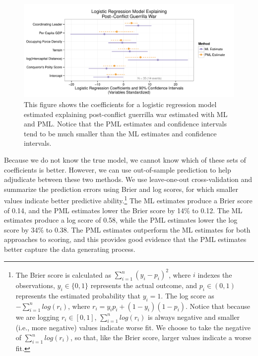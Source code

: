 \documentclass[12pt]{article}
\begin{document}
\begin{figure}[h]
\begin{center}
\includegraphics[width = \textwidth]{figs/weisiger-coefs.pdf}
\caption{This figure shows the coefficients for a logistic regression model estimated explaining post-conflict guerrilla war estimated with ML and PML.
Notice that the PML estimates and confidence intervals tend to be much smaller than the ML estimates and confidence intervals.}\label{fig:weisiger-coefs}
\end{center}
\end{figure}

Because we do not know the true model, we cannot know which of these sets of coefficients is better.
However, we can use out-of-sample prediction to help adjudicate between these two methods.
We use leave-one-out cross-validation and summarize the prediction errors using Brier and log scores, for which smaller values indicate better predictive ability.\footnote{The Brier score is calculated as $\sum_{i = 1}^n (y_i - p_i)^2$, where $i$ indexes the observations, $y_i \in \{0, 1\}$ represents the actual outcome, and $p_i \in (0, 1)$ represents the estimated probability that $y_i = 1$.
The log score as $-\sum_{i = 1}^n log(r_i)$, where $r_i = y_i p_i + (1 - y_i)(1 - p_i)$.
Notice that because we are logging $r_i \in [0, 1]$, $\sum_{i = 1}^n log(r_i)$ is always negative and smaller (i.e., more negative) values indicate worse fit.
We choose to take the negative of $\sum_{i = 1}^n log(r_i)$, so that, like the Brier score, larger values indicate a worse fit.}
The ML estimates produce a Brier score of 0.14, and the PML estimates lower the Brier score by 14\% to 0.12.
The ML estimates produce a log score of 0.58, while the PML estimates lower the log score by 34\% to 0.38.
The PML estimates outperform the ML estimates for both approaches to scoring, and
this provides good evidence that the PML estimates better capture the data generating process.
\end{document}
